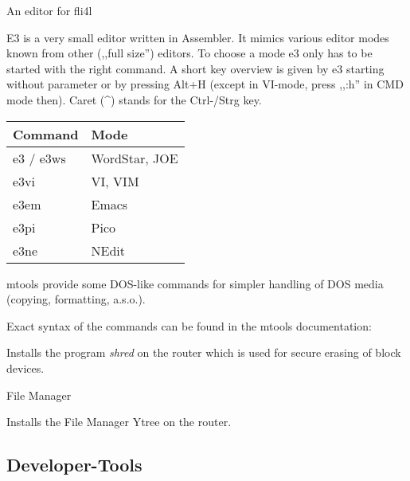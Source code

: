 \begin{description}

 An editor for fli4l

    E3 is a very small editor written in Assembler. It mimics various editor
    modes known from other (,,full size'') editors. To choose a mode e3 only has
    to be started with the right command. A short key overview is given by e3
    starting without parameter or by pressing Alt+H (except in VI-mode,
    press ,,:h'' in CMD mode then). Caret (\^{ }) stands for the Ctrl-/Strg key.

    \begin{tabular}{ll}
      Command & Mode \\
      \hline
      e3 / e3ws & WordStar, JOE \\
      e3vi      & VI, VIM \\
      e3em      & Emacs \\
      e3pi      & Pico \\
      e3ne      & NEdit
    \end{tabular}

 mtools provide some DOS-like commands
     for simpler handling of DOS media (copying, formatting, a.s.o.).

     Exact syntax of the commands can be found in the mtools documentation:\\


        Installs the program \emph{shred} on the router which is used
        for secure erasing of block devices.

 File Manager

    Installs the File Manager Ytree on the router.

\end{description}

\subsection {Developer-Tools}

